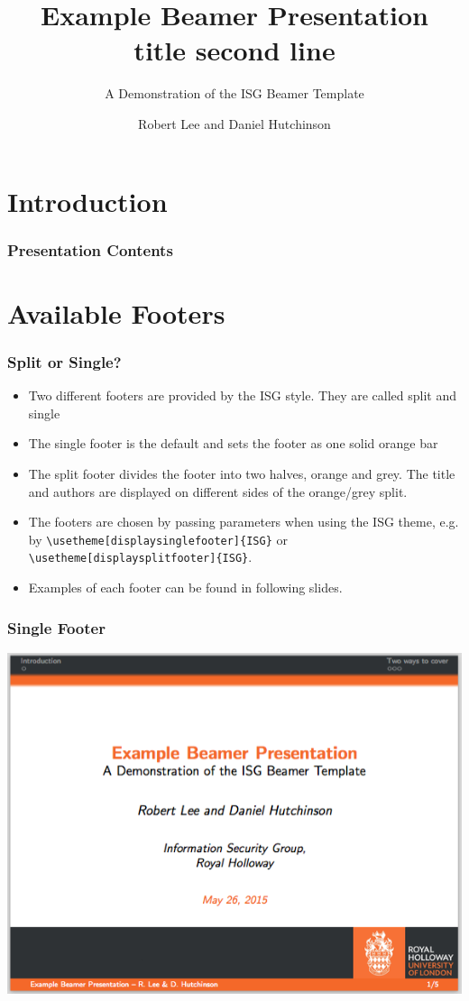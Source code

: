 \documentclass{beamer}
\title{Example Beamer Presentation\\title second line}
\subtitle{A Demonstration of the ISG Beamer Template}
\author[R. Lee \& D. Hutchinson]{Robert Lee and Daniel Hutchinson}
\institute{Information Security Group,\\
Royal Holloway}
\begin{document}
\begin{frame}
\titlepage
\end{frame}
\section{Introduction}


\begin{frame}\frametitle{Presentation Contents}
\tableofcontents
\end{frame}

\section{Available Footers}
\begin{frame}\frametitle{Split or Single?}
\begin{itemize}
	\item Two different footers are provided by the ISG style.  They are called split and single
	\item The single footer is the default and sets the footer as one solid orange bar
	\item The split footer divides the footer into two halves, orange and grey.  The title and authors are displayed on different sides of the orange/grey split.
	\item The footers are chosen by passing parameters when using the ISG theme, e.g. by \texttt{\textbackslash usetheme[displaysinglefooter]\{ISG\}} or \texttt{\textbackslash usetheme[displaysplitfooter]\{ISG\}}.
	\item Examples of each footer can be found in following slides.
\end{itemize}
\end{frame}

\begin{frame}\frametitle{Single Footer}
\begin{center}
	\includegraphics[scale=0.4]{graphics/single-footer.png}
\end{center}
\end{frame}
\end{document}
